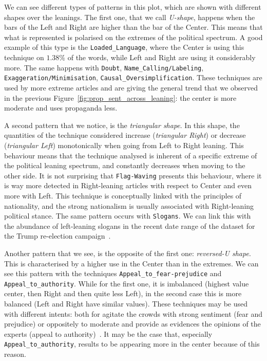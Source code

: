 We can see different types of patterns in this plot, which are shown with different shapes over the leanings.
The first one, that we call \emph{U-shape}, happens when the bars of the Left and Right are higher than the bar of the Center. This means that what is represented is polarised on the extremes of the political spectrum.
A good example of this type is the \texttt{Loaded\_Language}, where the Center is using this technique on $1.38\%$ of the words, while Left and Right are using it considerably more.
The same happens with \texttt{Doubt}, \texttt{Name\_Calling/Labeling}, \texttt{Exaggeration/Minimisation}, \texttt{Causal\_Oversimplification}.
These techniques are used by more extreme articles and are giving the general trend that we observed in the previous Figure~\ref{fig:prop_sent_across_leaning}: the center is more moderate and uses propaganda less.

A second pattern that we notice, is the \emph{triangular shape}. In this shape, the quantities of the technique considered increase (\emph{triangular Right}) or decrease (\emph{triangular Left}) monotonically when going from Left to Right leaning.
This behaviour means that the technique analysed is inherent of a specific extreme of the political leaning spectrum, and constantly decreases when moving to the other side.
It is not surprising that \texttt{Flag-Waving} presents this behaviour, where it is way more detected in Right-leaning articles with respect to Center and even more with Left. This technique is conceptually linked with the principles of nationality, and the strong nationalism is usually associated with Right-leaning political stance.
The same pattern occurs with \texttt{Slogans}. We can link this with the abundance of left-leaning slogans in the recent date range of the dataset for the Trump re-election campaign~\citep{jiang2020political}.

Another pattern that we see, is the opposite of the first one: \emph{reversed-U shape}. This is characterised by a higher use in the Center than in the extremes.
We can see this pattern with the techniques \texttt{Appeal\_to\_fear-prejudice} and \texttt{Appeal\_to\_authority}. While for the first one, it is imbalanced (highest value center, then Right and then quite less Left), in the second case this is more balanced (Left and Right have similar values).
These techniques may be used with different intents: both for agitate the crowds with strong sentiment (fear and prejudice) or oppositely to moderate and provide as evidences the opinions of the experts (appeal to authority)~\citep{walton2010appeal}. It may be the case that, especially \texttt{Appeal\_to\_authority}, results to be appearing more in the center because of this reason.

